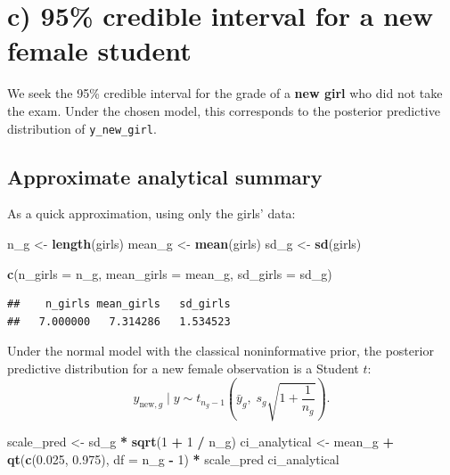 \documentclass[
  12pt,
]{article}
\newenvironment{Shaded}{\begin{snugshade}}{\end{snugshade}}
\newcommand{\AttributeTok}[1]{\textcolor[rgb]{0.13,0.29,0.53}{#1}}
\newcommand{\DecValTok}[1]{\textcolor[rgb]{0.00,0.00,0.81}{#1}}
\newcommand{\FloatTok}[1]{\textcolor[rgb]{0.00,0.00,0.81}{#1}}
\newcommand{\FunctionTok}[1]{\textcolor[rgb]{0.13,0.29,0.53}{\textbf{#1}}}
\newcommand{\NormalTok}[1]{#1}
\newcommand{\OtherTok}[1]{\textcolor[rgb]{0.56,0.35,0.01}{#1}}
\newcommand{\SpecialCharTok}[1]{\textcolor[rgb]{0.81,0.36,0.00}{\textbf{#1}}}
\begin{document}
\section{c) 95\% credible interval for a new female
student}\label{c-95-credible-interval-for-a-new-female-student}

We seek the 95\% credible interval for the grade of a \textbf{new girl}
who did not take the exam. Under the chosen model, this corresponds to
the posterior predictive distribution of \texttt{y\_new\_girl}.

\subsection{Approximate analytical
summary}\label{approximate-analytical-summary}

As a quick approximation, using only the girls' data:

\begin{Shaded}
\begin{Highlighting}[]
\NormalTok{n\_g }\OtherTok{\textless{}{-}} \FunctionTok{length}\NormalTok{(girls)}
\NormalTok{mean\_g }\OtherTok{\textless{}{-}} \FunctionTok{mean}\NormalTok{(girls)}
\NormalTok{sd\_g }\OtherTok{\textless{}{-}} \FunctionTok{sd}\NormalTok{(girls)}

\FunctionTok{c}\NormalTok{(}\AttributeTok{n\_girls =}\NormalTok{ n\_g, }\AttributeTok{mean\_girls =}\NormalTok{ mean\_g, }\AttributeTok{sd\_girls =}\NormalTok{ sd\_g)}
\end{Highlighting}
\end{Shaded}

\begin{verbatim}
##    n_girls mean_girls   sd_girls 
##   7.000000   7.314286   1.534523
\end{verbatim}

Under the normal model with the classical noninformative prior, the
posterior predictive distribution for a new female observation is a
Student \(t\): \[
y_{\text{new},g} \mid y \sim t_{n_g-1}\left(\bar y_g,\; s_g\sqrt{1+\frac{1}{n_g}}\right).
\]

\begin{Shaded}
\begin{Highlighting}[]
\NormalTok{scale\_pred }\OtherTok{\textless{}{-}}\NormalTok{ sd\_g }\SpecialCharTok{*} \FunctionTok{sqrt}\NormalTok{(}\DecValTok{1} \SpecialCharTok{+} \DecValTok{1} \SpecialCharTok{/}\NormalTok{ n\_g)}
\NormalTok{ci\_analytical }\OtherTok{\textless{}{-}}\NormalTok{ mean\_g }\SpecialCharTok{+} \FunctionTok{qt}\NormalTok{(}\FunctionTok{c}\NormalTok{(}\FloatTok{0.025}\NormalTok{, }\FloatTok{0.975}\NormalTok{), }\AttributeTok{df =}\NormalTok{ n\_g }\SpecialCharTok{{-}} \DecValTok{1}\NormalTok{) }\SpecialCharTok{*}\NormalTok{ scale\_pred}
\NormalTok{ci\_analytical}
\end{Highlighting}
\end{Shaded}
\end{document}
